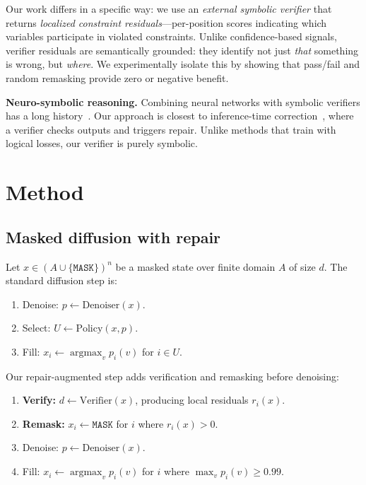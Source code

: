 \documentclass[11pt,a4paper,twoside]{article}
\theoremstyle{definition}
\newcommand{\Mask}{\mathtt{MASK}}
\newcommand{\argmax}{\operatorname{argmax}}
\begin{document}
Our work differs in a specific way: we use an \emph{external symbolic verifier} that returns \emph{localized constraint residuals}---per-position scores indicating which variables participate in violated constraints. Unlike confidence-based signals, verifier residuals are semantically grounded: they identify not just \emph{that} something is wrong, but \emph{where}. We experimentally isolate this by showing that pass/fail and random remasking provide zero or negative benefit.

\textbf{Neuro-symbolic reasoning.} Combining neural networks with symbolic verifiers has a long history~\cite{garcez2019neurosymbolic,manhaeve2018deepproblog}. Our approach is closest to inference-time correction~\cite{codex2025selfrefine}, where a verifier checks outputs and triggers repair. Unlike methods that train with logical losses, our verifier is purely symbolic.

\section{Method}
\label{sec:method}

\subsection{Masked diffusion with repair}
\label{sec:sampler}

Let $x \in (A \cup \{\Mask\})^n$ be a masked state over finite domain $A$ of size $d$. The standard diffusion step is:
\begin{enumerate}[leftmargin=2em]
    \item Denoise: $p \gets \text{Denoiser}(x)$.
    \item Select: $U \gets \text{Policy}(x, p)$.
    \item Fill: $x_i \gets \argmax_v p_i(v)$ for $i \in U$.
\end{enumerate}

Our repair-augmented step adds verification and remasking before denoising:
\begin{enumerate}[leftmargin=2em]
    \item \textbf{Verify:} $d \gets \text{Verifier}(x)$, producing local residuals $r_i(x)$.
    \item \textbf{Remask:} $x_i \gets \Mask$ for $i$ where $r_i(x) > 0$.
    \item Denoise: $p \gets \text{Denoiser}(x)$.
    \item Fill: $x_i \gets \argmax_v p_i(v)$ for $i$ where $\max_v p_i(v) \ge 0.99$.
\end{enumerate}
\end{document}
